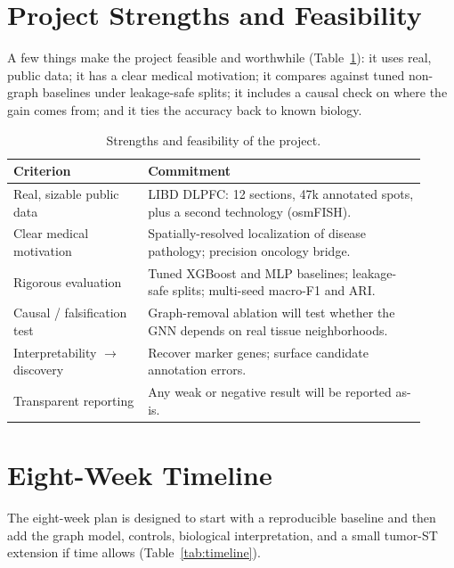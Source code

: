 \documentclass[11pt]{article}
\begin{document}
\section{Project Strengths and Feasibility}

A few things make the project feasible and worthwhile
(Table~\ref{tab:formula}): it uses real, public data; it has a clear medical
motivation; it compares against tuned non-graph baselines under leakage-safe
splits; it includes a causal check on where the gain comes from; and it ties the
accuracy back to known biology.

\begin{table}[H]
\centering\small
\begin{tabular}{>{\raggedright\arraybackslash}p{0.30\linewidth} >{\raggedright\arraybackslash}p{0.62\linewidth}}
\toprule
\rowcolor{sriblue}\color{white}\textbf{Criterion} & \color{white}\textbf{Commitment}\\
\midrule
\rowcolor{srirow} Real, sizable public data & LIBD DLPFC: 12 sections, 47k annotated spots, plus a second technology (osmFISH).\\
Clear medical motivation & Spatially-resolved localization of disease pathology; precision oncology bridge.\\
\rowcolor{srirow} Rigorous evaluation & Tuned XGBoost and MLP baselines; leakage-safe splits; multi-seed macro-F1 and ARI.\\
Causal / falsification test & Graph-removal ablation will test whether the GNN depends on real tissue neighborhoods.\\
\rowcolor{srirow} Interpretability $\rightarrow$ discovery & Recover marker genes; surface candidate annotation errors.\\
Transparent reporting & Any weak or negative result will be reported as-is.\\
\bottomrule
\end{tabular}
\caption{Strengths and feasibility of the project.}
\label{tab:formula}
\end{table}

\section{Eight-Week Timeline}

The eight-week plan is designed to start with a reproducible baseline and then
add the graph model, controls, biological interpretation, and a small tumor-ST
extension if time allows (Table~\ref{tab:timeline}).
\end{document}
